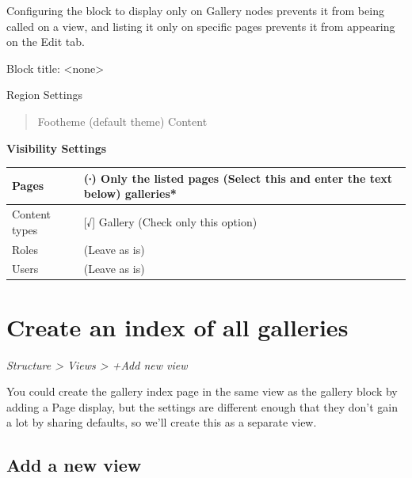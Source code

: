\documentclass[letterpaper,10pt,english]{sphinxmanual}
\begin{document}
Configuring the block to display only on Gallery nodes prevents it from being called on a view, and listing it only on specific pages prevents it from appearing on the Edit tab.

Block title:  \textless{}none\textgreater{}

Region Settings
\begin{quote}

Footheme (default theme)
Content
\end{quote}

\textbf{Visibility Settings}

\begin{tabulary}{\linewidth}{|L|L|}
\hline

Pages
 & 
(∙) Only the listed pages (Select this and enter the text below)
galleries*
\\\hline

Content types
 & 
{[}√{]} Gallery (Check only this option)
\\\hline

Roles
 & 
(Leave as is)
\\\hline

Users
 & 
(Leave as is)
\\\hline
\end{tabulary}



\chapter{Create an index of all galleries}
\label{slideshows:create-an-index-of-all-galleries}
\emph{Structure \textgreater{} Views \textgreater{} +Add new view}

You could create the gallery index page in the same view as the gallery block by adding a Page display, but the settings are different enough that they don’t gain a lot by sharing defaults, so we’ll create this as a separate view.


\section{Add a new view}
\label{slideshows:add-a-new-view}
\end{document}
